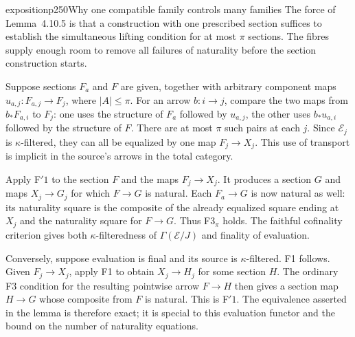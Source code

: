\begin{dcomment}{exposition}{p250}{Why one compatible family controls many families}
The force of Lemma~4.10.5 is that a construction with one prescribed section suffices to establish the simultaneous lifting condition for at most $\pi$ sections. The fibres supply enough room to remove all failures of naturality before the section construction starts.

Suppose sections $F_a$ and $F$ are given, together with arbitrary component maps $u_{a,j}:F_{a,j}\to F_j$, where $|A|\leq\pi$. For an arrow $b:i\to j$, compare the two maps from $b_*F_{a,i}$ to $F_j$: one uses the structure of $F_a$ followed by $u_{a,j}$, the other uses $b_*u_{a,i}$ followed by the structure of $F$. There are at most $\pi$ such pairs at each $j$. Since $\mathcal E_j$ is $\kappa$-filtered, they can all be equalized by one map $F_j\to X_j$. This use of transport is implicit in the source's arrows in the total category.

Apply F$'1$ to the section $F$ and the maps $F_j\to X_j$. It produces a section $G$ and maps $X_j\to G_j$ for which $F\to G$ is natural. Each $F_a\to G$ is now natural as well: its naturality square is the composite of the already equalized square ending at $X_j$ and the naturality square for $F\to G$. Thus F$3_\pi$ holds. The faithful cofinality criterion gives both $\kappa$-filteredness of $\Gamma(\mathcal E/J)$ and finality of evaluation.

Conversely, suppose evaluation is final and its source is $\kappa$-filtered. F1 follows. Given $F_j\to X_j$, apply F1 to obtain $X_j\to H_j$ for some section $H$. The ordinary F3 condition for the resulting pointwise arrow $F\to H$ then gives a section map $H\to G$ whose composite from $F$ is natural. This is F$'1$. The equivalence asserted in the lemma is therefore exact; it is special to this evaluation functor and the bound on the number of naturality equations.
\end{dcomment}


